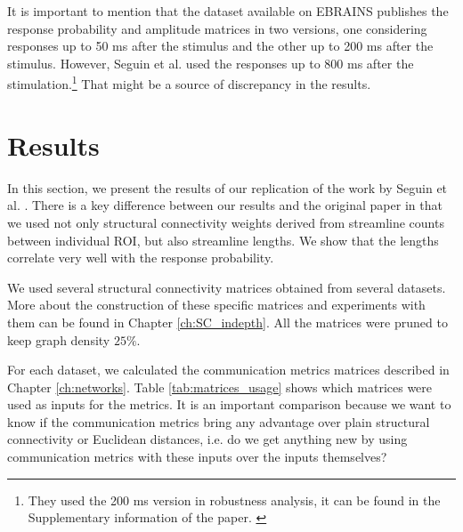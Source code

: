 It is important to mention that the dataset available on EBRAINS publishes the response probability and amplitude matrices in two versions, one considering responses up to 50 ms after the stimulus and the other up to 200 ms after the stimulus. However, Seguin et al. used the responses up to 800 ms after the stimulation.\footnote{They used the 200 ms version in robustness analysis, it can be found in the Supplementary information of the paper. \cite{seguin_communication_2023} } That might be a source of discrepancy in the results.

\section{Results}\label{sec:ftract_results}

In this section, we present the results of our replication of the work by Seguin et al. \cite{seguin_communication_2023}. There is a key difference between our results and the original paper in that we used not only structural connectivity weights derived from streamline counts between individual ROI, but also streamline lengths. We show that the lengths correlate very well with the response probability.

We used several structural connectivity matrices obtained from several datasets. More about the construction of these specific matrices and experiments with them can be found in Chapter \ref{ch:SC_indepth}. All the matrices were pruned to keep graph density $25\%$.

For each dataset, we calculated the communication metrics matrices described in Chapter \ref{ch:networks}. Table \ref{tab:matrices_usage} shows which matrices were used as inputs for the metrics. It is an important comparison because we want to know if the communication metrics bring any advantage over plain structural connectivity or Euclidean distances, i.e. do we get anything new by using communication metrics with these inputs over the inputs themselves? 

